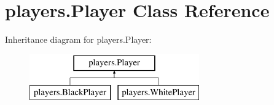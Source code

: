 \hypertarget{classplayers_1_1_player}{}\section{players.\+Player Class Reference}
\label{classplayers_1_1_player}
Inheritance diagram for players.\+Player\+:\begin{figure}[H]
\begin{center}
\leavevmode
\includegraphics[height=2.000000cm]{classplayers_1_1_player}
\end{center}
\end{figure}

